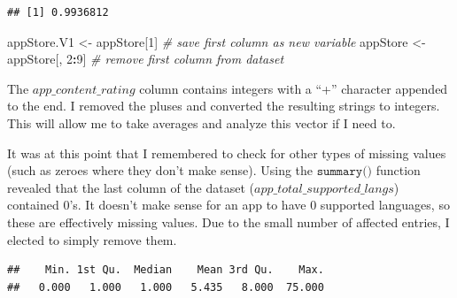 \documentclass[]{article}
\newenvironment{Shaded}{\begin{snugshade}}{\end{snugshade}}
\newcommand{\CharTok}[1]{\textcolor[rgb]{0.31,0.60,0.02}{#1}}
\newcommand{\CommentTok}[1]{\textcolor[rgb]{0.56,0.35,0.01}{\textit{#1}}}
\newcommand{\DecValTok}[1]{\textcolor[rgb]{0.00,0.00,0.81}{#1}}
\newcommand{\KeywordTok}[1]{\textcolor[rgb]{0.13,0.29,0.53}{\textbf{#1}}}
\newcommand{\NormalTok}[1]{#1}
\newcommand{\OperatorTok}[1]{\textcolor[rgb]{0.81,0.36,0.00}{\textbf{#1}}}
\newcommand{\StringTok}[1]{\textcolor[rgb]{0.31,0.60,0.02}{#1}}
\begin{document}
\begin{verbatim}
## [1] 0.9936812
\end{verbatim}

\begin{Shaded}
\begin{Highlighting}[]
\NormalTok{appStore.V1 <-}\StringTok{ }\NormalTok{appStore[}\DecValTok{1}\NormalTok{]  }\CommentTok{# save first column as new variable}
\NormalTok{appStore <-}\StringTok{ }\NormalTok{appStore[, }\DecValTok{2}\OperatorTok{:}\DecValTok{9}\NormalTok{]  }\CommentTok{# remove first column from dataset}
\end{Highlighting}
\end{Shaded}

The \(\textit{app\_content\_rating}\) column contains integers with a
``+'' character appended to the end. I removed the pluses and converted
the resulting strings to integers. This will allow me to take averages
and analyze this vector if I need to.

\begin{Shaded}
\end{Shaded}

It was at this point that I remembered to check for other types of
missing values (such as zeroes where they don't make sense). Using the
\(\texttt{summary()}\) function revealed that the last column of the
dataset (\(\textit{app\_total\_supported\_langs}\)) contained 0's. It
doesn't make sense for an app to have 0 supported languages, so these
are effectively missing values. Due to the small number of affected
entries, I elected to simply remove them.

\begin{Shaded}
\end{Shaded}

\begin{verbatim}
##    Min. 1st Qu.  Median    Mean 3rd Qu.    Max. 
##   0.000   1.000   1.000   5.435   8.000  75.000
\end{verbatim}
\end{document}
